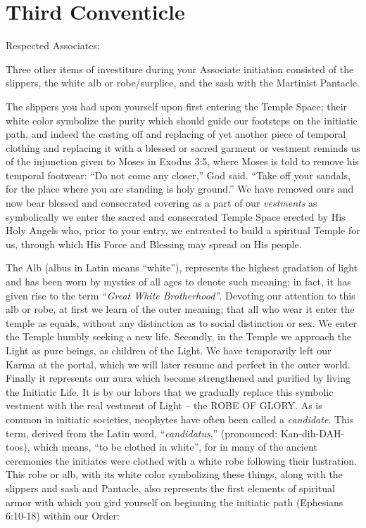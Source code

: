 \section{Third Conventicle}

Respected Associates:

Three other items of investiture during your Associate initiation consisted of the slippers, the white alb
or robe/surplice, and the sash with the Martinist Pantacle. 

The slippers you had upon yourself upon first entering the Temple Space; their white color symbolize
the purity which should guide our footsteps on the initiatic path, and indeed the casting off and
replacing of yet another piece of temporal clothing and replacing it with a blessed or sacred garment or
vestment reminds us of the injunction given to Moses in Exodus 3:5, where Moses is told to remove his
temporal footwear: ``Do not come any closer,'' God said. ``Take off your sandals, for the place where
you are standing is holy ground.'' We have removed ours and now bear blessed and consecrated
covering as a part of our \textit{vestments} as symbolically we enter the sacred and consecrated Temple Space
erected by His Holy Angels who, prior to your entry, we entreated to build a spiritual Temple for us,
through which His Force and Blessing may spread on His people.

The Alb (albus in Latin means ``white''), represents the highest gradation of light and has been worn by
mystics of all ages to denote such meaning; in fact, it has given rise to the term ``\textit{Great White
Brotherhood'}'. Devoting our attention to this alb or robe, at first we learn of the outer meaning; that
all who wear it enter the temple as equals, without any distinction as to social distinction or sex. We
enter the Temple humbly seeking a new life. Secondly, in the Temple we approach the Light as pure
beings, as children of the Light. We have temporarily left our Karma at the portal, which we will later
resume and perfect in the outer world. Finally it represents our aura which become strengthened and
purified by living the Initiatic Life. It is by our labors that we gradually replace this symbolic vestment
with the real vestment of Light – the ROBE OF GLORY. As is common in initiatic societies, neophytes
have often been called a \textit{candidate}. This term, derived from the Latin word, ``\textit{candidatus},''
(pronounced: Kan-dih-DAH-toos), which means, ``to be clothed in white'', for in many of the ancient
ceremonies the initiates were clothed with a white robe following their lustration. This robe or alb,
with its white color symbolizing these things, along with the slippers and sash and Pantacle, also
represents the first elements of spiritual armor with which you gird yourself on beginning the initiatic
path (Ephesians 6:10-18) within our Order: 


